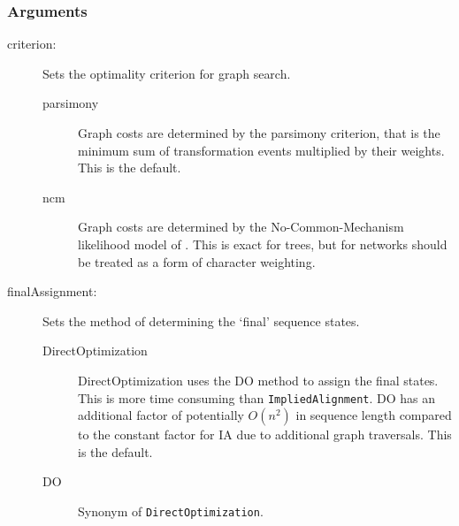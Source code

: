 	\subsubsection{Arguments}
		\begin{description}
			
		\item[criterion:] Sets the optimality criterion for graph search.
			
			\begin{description}
			\item[parsimony] Graph costs are determined by the parsimony criterion, that is the minimum 
			sum of transformation events multiplied by their weights. This is the default.
			
			\item[ncm] Graph costs are determined by the No-Common-Mechanism 
			likelihood model of \citep{TuffleyandSteel1997}.
			This is exact for trees, but for networks should be treated as a form of character weighting.  
			\end{description}
			
		\item[finalAssignment:] Sets the method of determining the `final' sequence states. 
						
			\begin{description}
			\item[DirectOptimization] DirectOptimization uses the DO 
			method to assign the final states. This is more time consuming than \texttt{ImpliedAlignment}. 
			DO has an additional factor of potentially $O(n^2)$ in sequence length compared 
			to the constant factor for IA due to additional graph traversals. This is the default.

			\item[DO] Synonym of \texttt{DirectOptimization}.
			

\end{description}
\end{description}
